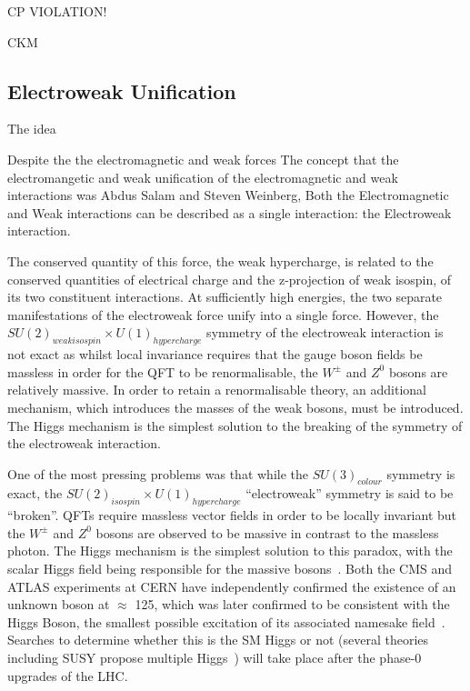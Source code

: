 CP VIOLATION!	

CKM

\subsection{Electroweak Unification}\label{subsec:electroweak}
The idea 


Despite the  the electromagnetic and weak forces 
The concept that the electromangetic and weak 
unification of the electromagnetic and weak interactions was Abdus Salam and Steven Weinberg, 
Both the Electromagnetic and Weak interactions can be described as a single interaction: the Electroweak interaction. 


The conserved quantity of this force, the weak hypercharge, is related to the conserved quantities of electrical charge and the z-projection of weak isospin, of its two constituent interactions. 
At sufficiently high energies, the two separate manifestations of the electroweak force unify into a single force. 
However, the $SU(2)_{weak isospin} \times U(1)_{hypercharge}$ symmetry of the electroweak interaction is not exact as whilst local invariance requires that the gauge boson fields be massless in order for the QFT to be renormalisable, the $W^{\pm}$ and $Z^{0}$ bosons are relatively massive. 
In order to retain a renormalisable theory, an additional mechanism, which introduces the masses of the weak bosons, must be introduced. 
The Higgs mechanism is the simplest solution to the breaking of the symmetry of the electroweak interaction\cite{LagrangiansSM}. 

One of the most pressing problems was that while the $SU(3)_{colour}$ symmetry is exact, the $SU(2)_{isospin} \times U(1)_{hypercharge}$ ``electroweak'' symmetry is said to be ``broken''. 
QFTs require massless vector fields in order to be locally invariant but the $W^{\pm}$ and $Z^{0}$ bosons are observed to be massive in contrast to the massless photon. 
The Higgs mechanism is the simplest solution to this paradox, with the scalar Higgs field being responsible for the massive bosons~\cite{oldcms}. 
Both the CMS and ATLAS experiments at CERN have independently confirmed the existence of an unknown boson at $\approx$ 125\GeV, which was later confirmed to be consistent with the Higgs Boson, the smallest possible excitation of its associated namesake field~\cite{HiggsCMS,HiggsATLAS}. 
Searches to determine whether this is the SM Higgs or not (several theories including SUSY propose multiple Higgs~\cite{Khalil:2003vd,Gianotti:2002xx}) will take place after the phase-0 upgrades of the LHC. 

